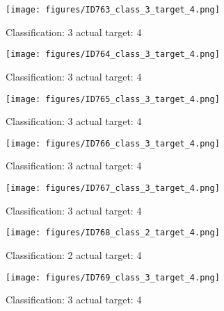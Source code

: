 \begin{figure}[h!]
\begin{center}
\texttt{[image: figures/ID763\_class\_3\_target\_4.png]}
\end{center}
\caption{ Classification: 3 actual target: 4}
\label{fig:ID763_class_3_target_4}
\end{figure}
\begin{figure}[h!]
\begin{center}
\texttt{[image: figures/ID764\_class\_3\_target\_4.png]}
\end{center}
\caption{ Classification: 3 actual target: 4}
\label{fig:ID764_class_3_target_4}
\end{figure}
\begin{figure}[h!]
\begin{center}
\texttt{[image: figures/ID765\_class\_3\_target\_4.png]}
\end{center}
\caption{ Classification: 3 actual target: 4}
\label{fig:ID765_class_3_target_4}
\end{figure}
\begin{figure}[h!]
\begin{center}
\texttt{[image: figures/ID766\_class\_3\_target\_4.png]}
\end{center}
\caption{ Classification: 3 actual target: 4}
\label{fig:ID766_class_3_target_4}
\end{figure}
\begin{figure}[h!]
\begin{center}
\texttt{[image: figures/ID767\_class\_3\_target\_4.png]}
\end{center}
\caption{ Classification: 3 actual target: 4}
\label{fig:ID767_class_3_target_4}
\end{figure}
\begin{figure}[h!]
\begin{center}
\texttt{[image: figures/ID768\_class\_2\_target\_4.png]}
\end{center}
\caption{ Classification: 2 actual target: 4}
\label{fig:ID768_class_2_target_4}
\end{figure}
\begin{figure}[h!]
\begin{center}
\texttt{[image: figures/ID769\_class\_3\_target\_4.png]}
\end{center}
\caption{ Classification: 3 actual target: 4}
\label{fig:ID769_class_3_target_4}
\end{figure}
